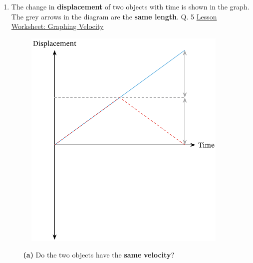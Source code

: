 \documentclass[A4,12pt]{article}
\begin{document}
\begin{enumerate}[label=\bfseries (\arabic*)]
\begin{itemize}
\end{itemize}













\item The change in \textbf{displacement} of two objects with time is shown in the graph. The grey arrows in the diagram are the \textbf{same length}. \cite{Nagwa} Q. 5 \href{https://www.nagwa.com/en/worksheets/715142164735/}{Lesson Worksheet: Graphing Velocity}
%
\begin{figure}[H]
    \centering
    \includegraphics[scale=0.7]{Nagwa_Q5_disp.png}
\end{figure}
%
\begin{itemize}
    \item[\bf (a)] Do the two objects have the \textbf{same} \textbf{velocity}?
    

\end{itemize}
\end{enumerate}
\end{document}
